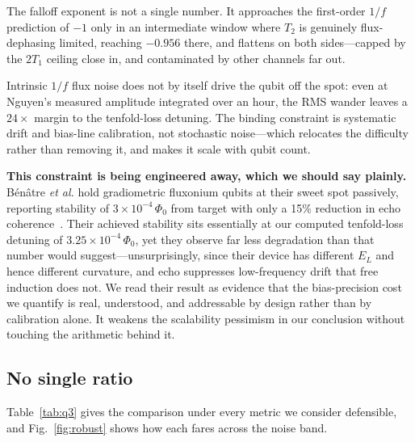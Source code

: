 \documentclass[journal]{IEEEtran}
\begin{document}
The falloff exponent is not a single number. It approaches the first-order $1/f$ prediction
of $-1$ only in an intermediate window where $T_2$ is genuinely flux-dephasing limited,
reaching $-0.956$ there, and flattens on both sides---capped by the $2T_1$ ceiling close in,
and contaminated by other channels far out.

Intrinsic $1/f$ flux noise does not by itself drive the qubit off the spot: even at Nguyen's
measured amplitude integrated over an hour, the RMS wander leaves a $24\times$ margin to the
tenfold-loss detuning. The binding constraint is systematic drift and bias-line calibration,
not stochastic noise---which relocates the difficulty rather than removing it, and makes it
scale with qubit count.

\textbf{This constraint is being engineered away, which we should say plainly.} B\'en\^atre
\emph{et al.} hold gradiometric fluxonium qubits at their sweet spot passively, reporting
stability of $3\times10^{-4}\,\Phi_0$ from target with only a 15\% reduction in echo
coherence~\cite{benatre2025}. Their achieved stability sits essentially at our computed
tenfold-loss detuning of $3.25\times10^{-4}\,\Phi_0$, yet they observe far less degradation
than that number would suggest---unsurprisingly, since their device has different $E_L$ and
hence different curvature, and echo suppresses low-frequency drift that free induction does
not. We read their result as evidence that the bias-precision cost we quantify is real,
understood, and addressable by design rather than by calibration alone. It weakens the
scalability pessimism in our conclusion without touching the arithmetic behind it.

\subsection{No single ratio}

Table~\ref{tab:q3} gives the comparison under every metric we consider defensible, and
Fig.~\ref{fig:robust} shows how each fares across the noise band.
\end{document}
